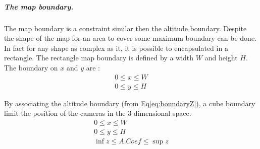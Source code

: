  \subparagraph{The map boundary.}
 The map boundary is a constraint similar then the altitude boundary. Despite the shape of the map for an area to cover some maximum boundary can be done. In fact for any shape as complex as it, it is  possible to  encapsulated in a rectangle. The rectangle map boundary is defined by a width $W$ and height $H$. The boundary on $x$ and $y$ are :
 \begin{equation}
  \begin{array}{lcl}
  	0\leq x\leq W \\ 0\leq y\leq H 
  \end{array} 
 \end{equation}  
 
By associating the altitude boundary (from Eq\ref{eq:boundaryZ}), a cube boundary limit the position of the cameras in the 3 dimensional space. 
\begin{equation}\label{eq:3dBoundary}
  \begin{array}{lclcl}
  	0\leq x\leq W \\ 0\leq y\leq H  \\ \inf z\leq A.Coef\leq \sup z  
  \end{array} 
 \end{equation} 
 
